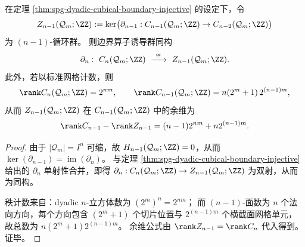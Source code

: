 \begin{corollary}\label{cor:spg-dyadic-topdim-holography-exactness}
在定理 \ref{thm:spg-dyadic-cubical-boundary-injective} 的设定下，令
\[
Z_{n-1}(\mathcal Q_m;\ZZ):=\ker\bigl(\partial_{n-1}:C_{n-1}(\mathcal Q_m;\ZZ)\to C_{n-2}(\mathcal Q_m;\ZZ)\bigr)
\]
为 \((n-1)\)-循环群。
则边界算子诱导群同构
\[
\partial_n:\ C_n(\mathcal Q_m;\ZZ)\ \xrightarrow{\ \cong\ }\ Z_{n-1}(\mathcal Q_m;\ZZ).
\]
此外，若以标准网格计数，则
\[
\rank C_n(\mathcal Q_m;\ZZ)=2^{nm},\qquad
\rank C_{n-1}(\mathcal Q_m;\ZZ)=n(2^m+1)\,2^{(n-1)m},
\]
从而 \(Z_{n-1}(\mathcal Q_m;\ZZ)\) 在 \(C_{n-1}(\mathcal Q_m;\ZZ)\) 中的余维为
\[
\rank C_{n-1}-\rank Z_{n-1}
=(n-1)2^{nm}+n2^{(n-1)m}.
\]
\end{corollary}
\begin{proof}
由于 \(|\mathcal Q_m|=I^n\) 可缩，故 \(H_{n-1}(\mathcal Q_m;\ZZ)=0\)，从而
\(
\ker(\partial_{n-1})=\operatorname{im}(\partial_n)
\)。
与定理 \ref{thm:spg-dyadic-cubical-boundary-injective} 给出的 \(\partial_n\) 单射性合并，即得
\(\partial_n:C_n(\mathcal Q_m;\ZZ)\to Z_{n-1}(\mathcal Q_m;\ZZ)\)
为双射，从而为同构。
\par
秩计数来自：dyadic \(n\)-立方体数为 \((2^m)^n=2^{nm}\)；
而 \((n-1)\)-面数为 \(n\) 个法向方向，每个方向包含 \((2^m+1)\) 个切片位置与 \(2^{(n-1)m}\) 个横截面网格单元，故总数为 \(n(2^m+1)2^{(n-1)m}\)。
余维公式由 \(\rank Z_{n-1}=\rank C_n\) 代入得到。
证毕。
\end{proof}





